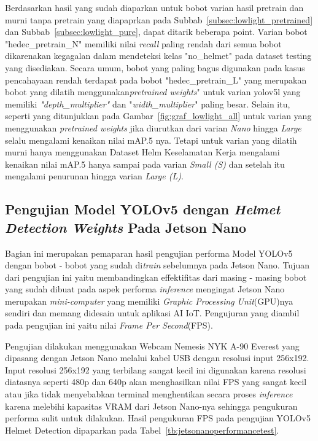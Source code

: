 \begin{enumerate}
  \par Berdasarkan hasil yang sudah diaparkan untuk bobot varian hasil 
  pretrain dan murni tanpa pretrain yang diapaprkan pada Subbab~\ref{subsec:lowlight_pretrained} 
  dan Subbab~\ref{subsec:lowlight_pure}, dapat ditarik beberapa point. Varian bobot "hedec\_pretrain\_N"
  memiliki nilai \emph{recall} paling rendah dari semua bobot dikarenakan kegagalan dalam mendeteksi
  kelas "no\_helmet" pada dataset testing yang disediakan. Secara umum, bobot yang paling bagus digunakan
  pada kasus pencahayaan rendah terdapat pada bobot "hedec\_pretrain\_L" yang merupakan
  bobot yang dilatih menggunakan\emph{pretrained weights}" untuk varian yolov5l yang memiliki
  \emph{"depth\_multiplier"} dan "\emph{width\_multiplier}" paling besar. Selain itu, seperti yang
  ditunjukkan pada Gambar~\ref{fig:graf_lowlight_all} untuk varian yang menggunakan
  \emph{pretrained weights} jika diurutkan dari varian \emph{Nano} hingga \emph{Large} selalu mengalami
  kenaikan nilai mAP.5 nya. Tetapi untuk varian yang dilatih murni hanya menggunakan Dataset Helm Keselamatan Kerja
  mengalami kenaikan nilai mAP.5 hanya sampai pada varian \emph{Small (S)} dan setelah itu mengalami penurunan hingga varian \emph{Large (L)}.

  
\end{enumerate}


\subsection{Pengujian Model YOLOv5 dengan \emph{Helmet Detection Weights} Pada Jetson Nano}
\label{subsec:jetsonnano_hedectest}

\par Bagian ini merupakan pemaparan hasil pengujian performa Model YOLOv5 dengan bobot - bobot yang sudah di\emph{train}
sebelumnya pada Jetson Nano. Tujuan dari pengujian ini yaitu membandingkan effektifitas dari masing - masing
bobot yang sudah dibuat pada aspek performa \emph{inference} mengingat Jetson Nano merupakan \emph{mini-computer} yang memiliki
\emph{Graphic Processing Unit}(GPU)nya sendiri dan memang didesain untuk aplikasi AI IoT. Pengujuran yang diambil pada pengujian ini
yaitu nilai \emph{Frame Per Second}(FPS).

\par Pengujian dilakukan menggunakan Webcam Nemesis NYK A-90 Everest yang dipasang dengan Jetson Nano melalui kabel USB dengan resolusi
input 256x192. Input resolusi 256x192 yang terbilang sangat kecil ini digunakan karena resolusi diatasnya seperti 480p dan 640p akan menghasilkan
nilai FPS yang sangat kecil atau jika tidak menyebabkan terminal menghentikan secara proses \emph{inference} karena melebihi kapasitas VRAM dari Jetson Nano-nya
sehingga pengukuran performa sulit untuk dilakukan. Hasil pengukuran FPS pada pengujian YOLOv5 Helmet Detection dipaparkan pada Tabel~\ref{tb:jetsonanoperformancetest}.



